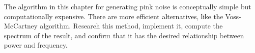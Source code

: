 \begin{exercise}
	The algorithm in this chapter for generating pink noise is
	conceptually simple but computationally expensive.  There are
	more efficient alternatives, like the Voss-McCartney algorithm.
	Research this method, implement it, compute the spectrum of
	the result, and confirm that it has the desired relationship
	between power and frequency.
\end{exercise}